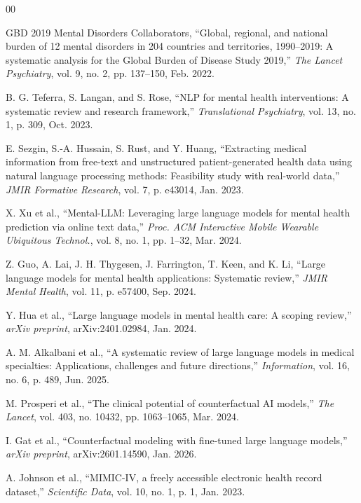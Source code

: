 \documentclass[conference]{IEEEtran}
\begin{document}
\begin{thebibliography}{00}

 GBD 2019 Mental Disorders Collaborators, ``Global, regional, and national burden of 12 mental disorders in 204 countries and territories, 1990--2019: A systematic analysis for the Global Burden of Disease Study 2019,'' \textit{The Lancet Psychiatry}, vol. 9, no. 2, pp. 137--150, Feb. 2022.

 B. G. Teferra, S. Langan, and S. Rose, ``NLP for mental health interventions: A systematic review and research framework,'' \textit{Translational Psychiatry}, vol. 13, no. 1, p. 309, Oct. 2023.

 E. Sezgin, S.-A. Hussain, S. Rust, and Y. Huang, ``Extracting medical information from free-text and unstructured patient-generated health data using natural language processing methods: Feasibility study with real-world data,'' \textit{JMIR Formative Research}, vol. 7, p. e43014, Jan. 2023.

 X. Xu et al., ``Mental-LLM: Leveraging large language models for mental health prediction via online text data,'' \textit{Proc. ACM Interactive Mobile Wearable Ubiquitous Technol.}, vol. 8, no. 1, pp. 1--32, Mar. 2024.

 Z. Guo, A. Lai, J. H. Thygesen, J. Farrington, T. Keen, and K. Li, ``Large language models for mental health applications: Systematic review,'' \textit{JMIR Mental Health}, vol. 11, p. e57400, Sep. 2024.

 Y. Hua et al., ``Large language models in mental health care: A scoping review,'' \textit{arXiv preprint}, arXiv:2401.02984, Jan. 2024.

 A. M. Alkalbani et al., ``A systematic review of large language models in medical specialties: Applications, challenges and future directions,'' \textit{Information}, vol. 16, no. 6, p. 489, Jun. 2025.

 M. Prosperi et al., ``The clinical potential of counterfactual AI models,'' \textit{The Lancet}, vol. 403, no. 10432, pp. 1063--1065, Mar. 2024.

 I. Gat et al., ``Counterfactual modeling with fine-tuned large language models,'' \textit{arXiv preprint}, arXiv:2601.14590, Jan. 2026.

 A. Johnson et al., ``MIMIC-IV, a freely accessible electronic health record dataset,'' \textit{Scientific Data}, vol. 10, no. 1, p. 1, Jan. 2023.


\end{thebibliography}
\end{document}
